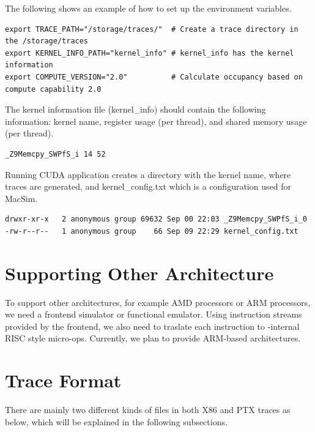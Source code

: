 The following shows an example of how to set up the environment variables.


\begin{Verbatim}
export TRACE_PATH="/storage/traces/"  # Create a trace directory in the /storage/traces
export KERNEL_INFO_PATH="kernel_info" # kernel_info has the kernel information
export COMPUTE_VERSION="2.0"          # Calculate occupancy based on compute capability 2.0
\end{Verbatim}


The kernel information file (kernel\_info) should contain the following
information: kernel name, register usage (per thread), and shared memory usage
(per thread).


\begin{Verbatim}
_Z9Memcpy_SWPfS_i 14 52 
\end{Verbatim}


Running CUDA application creates a directory with the kernel name, where traces 
are generated, and kernel\_config.txt which is a configuration used for MacSim.


\begin{Verbatim}
drwxr-xr-x   2 anonymous group 69632 Sep 00 22:03 _Z9Memcpy_SWPfS_i_0
-rw-r--r--   1 anonymous group    66 Sep 09 22:29 kernel_config.txt
\end{Verbatim}



\section{Supporting Other Architecture}

To support other architectures, for example AMD processors or ARM
processors, we need a frontend simulator or functional emulator. Using
instruction streams provided by the frontend, we also need to traslate
each instruction to \SIM-internal RISC style micro-ops. Currently, we
plan to provide ARM-based architectures.


\section{Trace Format}
\label{sec:traceformat}

There are mainly two different kinds of files in both X86 and PTX traces as
below, which will be explained in the following subsections.

